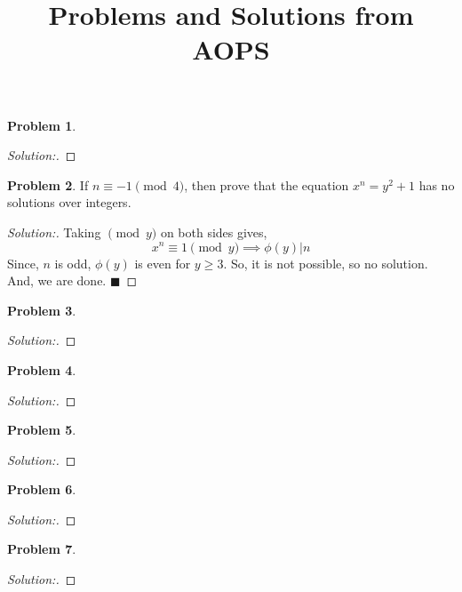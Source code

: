 \documentclass[11 pt]{article}
\theoremstyle{definition}
\newtheorem{prbm}{Problem}[section]
\theoremstyle{definition}
\newtheorem{proof}{Proof}[section]
\begin{document}
\title{Problems and Solutions from AOPS}
\maketitle

\begin{prbm}
    
    \begin{proof}[Solution:]
    
    
    \end{proof}
    
\end{prbm}


\begin{prbm}
    If $n \equiv -1 \pmod{4}$, then prove that the equation $x^n=y^2+1$ has no solutions over integers.
    \begin{proof}[Solution:]
    Taking $\pmod{y}$ on both sides gives,
$$x^n \equiv 1 \pmod{y} \implies \phi(y)|n$$Since, $n$ is odd, $\phi(y)$ is even for $y \geq 3$. So, it is not possible, so no solution. And, we are done. $\blacksquare$
    
    \end{proof}
    
\end{prbm}


\begin{prbm}
    
    \begin{proof}[Solution:]
    
    
    \end{proof}
    
\end{prbm}
\begin{prbm}
    
    \begin{proof}[Solution:]
    
    
    \end{proof}
    
\end{prbm}\begin{prbm}
    
    \begin{proof}[Solution:]
    
    
    \end{proof}
    
\end{prbm}
\begin{prbm}
    
    \begin{proof}[Solution:]
    
    
    \end{proof}
    
\end{prbm}
\begin{prbm}
    
    \begin{proof}[Solution:]
    
    
    \end{proof}
    
\end{prbm}
    
    
\end{document}
